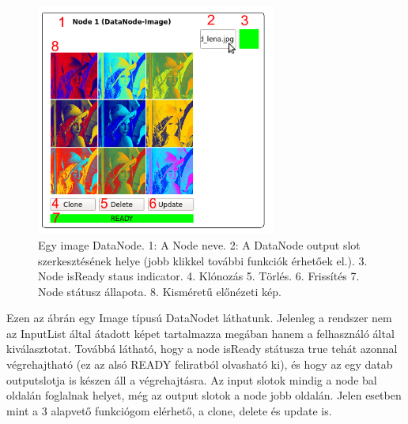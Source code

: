 \documentclass[a4paper,12pt,oneside]{report}
\begin{document}
\begin{center}
\begin{figure}[h]
  \includegraphics[width=0.7\textwidth]{datanode_full.png}
  \caption{Egy image DataNode. 1: A Node neve. 2: A DataNode output slot szerkesztésének helye (jobb klikkel további funkciók érhetőek el.). 3. Node isReady staus indicator. 4. Klónozás 5. Törlés. 6. Frissítés 7. Node státusz állapota. 8. Kisméretű előnézeti kép.}

  \label{fig:bimg_node_editor}
\end{figure}
\end{center}

Ezen az ábrán egy Image típusú DataNodet láthatunk. Jelenleg a rendszer nem az InputList által átadott képet tartalmazza megában hanem a felhasználó által kiválasztotat. Továbbá látható, hogy a node isReady státusza true tehát azonnal végrehajtható (ez az alsó READY feliratból olvasható ki), és hogy az egy datab outputslotja is készen áll a végrehajtásra. Az input slotok mindig a node bal oldalán foglalnak helyet, még az output slotok a node jobb oldalán. Jelen esetben mint a 3 alapvető funkciógom elérhető, a clone, delete és update is.
\end{document}
